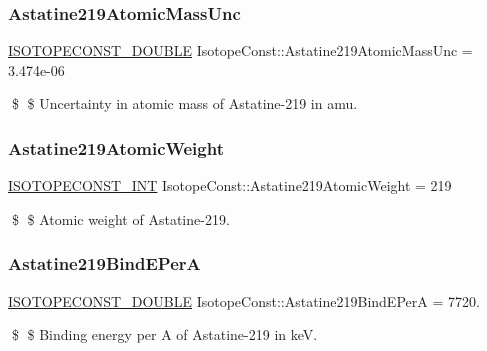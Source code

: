 \subsubsection{\texorpdfstring{Astatine219\+Atomic\+Mass\+Unc}{Astatine219AtomicMassUnc}}
{\footnotesize\ttfamily \mbox{\hyperlink{group___isotope_const-_macros_ga8f45a7272ce02c0b4c65c44636ed719a}{I\+S\+O\+T\+O\+P\+E\+C\+O\+N\+S\+T\+\_\+\+D\+O\+U\+B\+LE}} Isotope\+Const\+::\+Astatine219\+Atomic\+Mass\+Unc = 3.\+474e-\/06}

\$ \$ Uncertainty in atomic mass of Astatine-\/219 in amu. \mbox{\label{group___isotope_const-_astatine-_at219_ga4c1c5a3239024ebceea1979a61138c80}} 
\subsubsection{\texorpdfstring{Astatine219\+Atomic\+Weight}{Astatine219AtomicWeight}}
{\footnotesize\ttfamily \mbox{\hyperlink{group___isotope_const-_macros_ga5f18360b3e99483a35c32d789e62621c}{I\+S\+O\+T\+O\+P\+E\+C\+O\+N\+S\+T\+\_\+\+I\+NT}} Isotope\+Const\+::\+Astatine219\+Atomic\+Weight = 219}

\$ \$ Atomic weight of Astatine-\/219. \mbox{\label{group___isotope_const-_astatine-_at219_gadd744470a4c5191b170118c04f22170b}} 
\subsubsection{\texorpdfstring{Astatine219\+Bind\+E\+PerA}{Astatine219BindEPerA}}
{\footnotesize\ttfamily \mbox{\hyperlink{group___isotope_const-_macros_ga8f45a7272ce02c0b4c65c44636ed719a}{I\+S\+O\+T\+O\+P\+E\+C\+O\+N\+S\+T\+\_\+\+D\+O\+U\+B\+LE}} Isotope\+Const\+::\+Astatine219\+Bind\+E\+PerA = 7720.}

\$ \$ Binding energy per A of Astatine-\/219 in keV. \mbox{\label{group___isotope_const-_astatine-_at219_gaacf8567c2feab488a366a38b402cd7b8}} 

